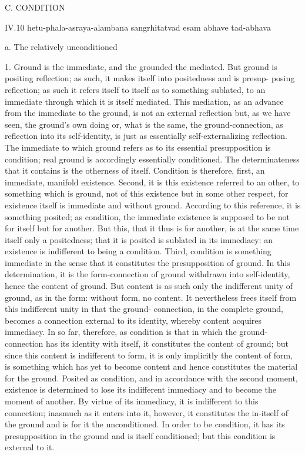 C. CONDITION

IV.10
hetu-phala-asraya-alambana sangrhitatvad esam abhave tad-abhava

a. The relatively unconditioned

1. Ground is the immediate, and the grounded the mediated. But ground
is positing reflection; as such, it makes itself into positedness and is presup-
posing reflection; as such it refers itself to itself as to something sublated,
to an immediate through which it is itself mediated. This mediation, as an
advance from the immediate to the ground, is not an external reflection
but, as we have seen, the ground's own doing or, what is the same, the
ground-connection, as reflection into its self-identity, is just as essentially
self-externalizing reflection. The immediate to which ground refers as to its
essential presupposition is condition; real ground is accordingly essentially
conditioned. The determinateness that it contains is the otherness of itself.
Condition is therefore, first, an immediate, manifold existence. Second,
it is this existence referred to an other, to something which is ground, not
of this existence but in some other respect, for existence itself is immediate
and without ground. According to this reference, it is something posited;
as condition, the immediate existence is supposed to be not for itself
but for another. But this, that it thus is for another, is at the same time
itself only a positedness; that it is posited is sublated in its immediacy: an
existence is indifferent to being a condition. Third, condition is something
immediate in the sense that it constitutes the presupposition of ground. In
this determination, it is the form-connection of ground withdrawn into
self-identity, hence the content of ground. But content is as such only the
indifferent unity of ground, as in the form: without form, no content.
It nevertheless frees itself from this indifferent unity in that the ground-
connection, in the complete ground, becomes a connection external to
its identity, whereby content acquires immediacy. In so far, therefore, as
condition is that in which the ground-connection has its identity with itself,
it constitutes the content of ground; but since this content is indifferent
to form, it is only implicitly the content of form, is something which has
yet to become content and hence constitutes the material for the ground.
Posited as condition, and in accordance with the second moment, existence
is determined to lose its indifferent immediacy and to become the moment
of another. By virtue of its immediacy, it is indifferent to this connection;
inasmuch as it enters into it, however, it constitutes the in-itself of the
ground and is for it the unconditioned. In order to be condition, it has its
presupposition in the ground and is itself conditioned; but this condition
is external to it.

